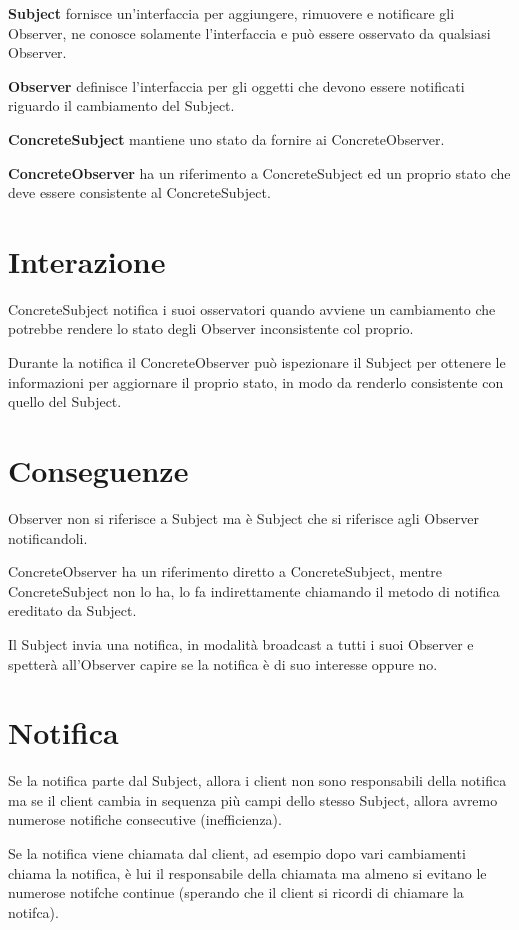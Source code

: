 \textbf{Subject} fornisce un'interfaccia per aggiungere, rimuovere e notificare gli Observer, ne conosce solamente l'interfaccia e può essere osservato da qualsiasi 
Observer.

\textbf{Observer} definisce l'interfaccia per gli oggetti che devono essere notificati riguardo il cambiamento del Subject.

\textbf{ConcreteSubject} mantiene uno stato da fornire ai ConcreteObserver.

\textbf{ConcreteObserver} ha un riferimento a ConcreteSubject ed un proprio stato che deve essere consistente al ConcreteSubject. 

\section{Interazione}

ConcreteSubject notifica i suoi osservatori quando avviene un cambiamento che potrebbe rendere lo stato degli Observer inconsistente col proprio.

Durante la notifica il ConcreteObserver può ispezionare il Subject per ottenere le informazioni per aggiornare il proprio stato, in modo da renderlo consistente con
quello del Subject.

\section{Conseguenze}

Observer non si riferisce a Subject ma è Subject che si riferisce agli Observer notificandoli.

ConcreteObserver ha un riferimento diretto a ConcreteSubject, mentre ConcreteSubject non lo ha, lo fa indirettamente chiamando il metodo di notifica ereditato da 
Subject.

Il Subject invia una notifica, in modalità broadcast a tutti i suoi Observer e spetterà all'Observer capire se la notifica è di suo interesse oppure no.

\section{Notifica}

Se la notifica parte dal Subject, allora i client non sono responsabili della notifica ma se il client cambia in sequenza più campi dello stesso Subject, allora 
avremo numerose notifiche consecutive (inefficienza).

Se la notifica viene chiamata dal client, ad esempio dopo vari cambiamenti chiama la notifica, è lui il responsabile della chiamata ma almeno si evitano le numerose 
notifche continue (sperando che il client si ricordi di chiamare la notifca).

